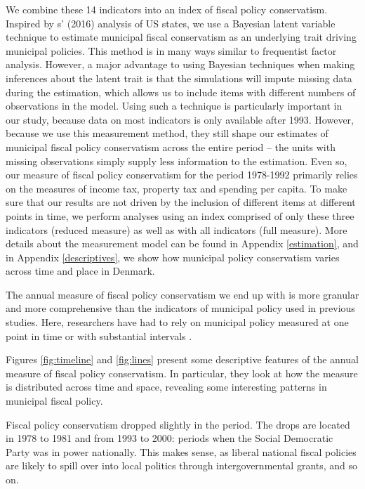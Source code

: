 \documentclass[a4paper,12pt]{article}
\begin{document}
We combine these 14 indicators into an index of fiscal policy conservatism. Inspired by \citeauthor{caughey2016dynamics}s' (2016) analysis of US states, we use a Bayesian latent variable technique to estimate municipal fiscal conservatism as an underlying trait driving municipal policies.  This method is in many ways similar to frequentist factor analysis. However, a major advantage to using Bayesian techniques when making inferences about the latent trait is that the simulations will impute missing data during the estimation, which allows us to include items with different numbers of observations in the model. Using such a technique is particularly important in our study, because data on most indicators is only available after 1993. However, because we use this measurement method, they still shape our estimates of municipal fiscal policy conservatism across the entire period -- the units with missing observations simply supply less information to the estimation. Even so, our measure of fiscal policy conservatism for the period 1978-1992 primarily relies on the measures of income tax, property tax and spending per capita. To make sure that our results are not driven by the inclusion of different items at different points in time, we perform analyses using an index comprised of only these three indicators (reduced measure) as well as with all indicators (full measure). More details about the measurement model can be found in Appendix \ref{estimation}, and in Appendix \ref{descriptives}, we show how municipal policy conservatism varies across time and place in Denmark.

The annual measure of fiscal policy conservatism we end up with is more granular and more comprehensive than the indicators of municipal policy used in previous studies. Here, researchers have had to rely on municipal policy measured at one point in time \citep{tausanovitch2014representation,palus2010responsiveness} or  with substantial intervals \citep{sances2017voters,einstein2016pushing,hajnal2010or}. 

Figures \ref{fig:timeline} and \ref{fig:lines} present some descriptive features of the annual measure of fiscal policy conservatism. In particular, they look at how the measure is distributed across time and space, revealing some interesting patterns in municipal fiscal policy.

Fiscal policy conservatism dropped slightly in the period. The drops are located in 1978 to 1981 and from 1993 to 2000: periods when the Social Democratic Party was in power nationally. This makes sense, as liberal national fiscal policies are likely to spill over into local politics through intergovernmental grants, and so on.
\end{document}
